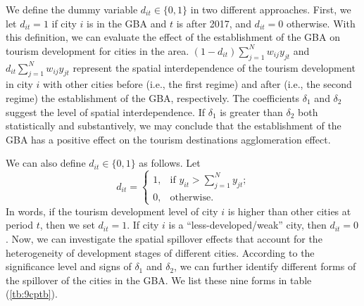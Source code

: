 \documentclass[11pt,a4paper]{amsart}
\theoremstyle{plain}
\theoremstyle{definition}
\begin{document}
\noindent We define the dummy variable $d_{it} \in \{0, 1\}$ in two different approaches. First, we let $d_{it} = 1$ if city $i$ is in the GBA and $t$ is after 2017, and $d_{it} = 0$ otherwise. With this definition, we can evaluate the effect of the establishment of the GBA on tourism development for cities in the area. $(1-d_{it})\sum_{j = 1}^{N}w_{ij}y_{jt}$ and $d_{it}\sum_{j = 1}^{N}w_{ij}y_{jt}$  represent the spatial interdependence of the tourism development in city $i$ with other cities before (i.e., the first regime) and after (i.e., the second regime) the establishment of the GBA, respectively. The coefficients $\delta_{1}$ and $\delta_{2}$ suggest the level of spatial interdependence. If $\delta_{1}$ is greater than $\delta_{2}$ both statistically and substantively, we may conclude that the establishment of the GBA has a positive effect on the tourism destinations agglomeration effect.

\noindent  We can also define $d_{it} \in \{0, 1\}$ as follows. Let 
\[	d_{it} = \begin{cases}
	1, &\text{if $y_{it} > \sum_{j = 1}^{N}y_{jt}$;}\\
	0, &\text{otherwise.}
\end{cases}	\]
In words, if the tourism development level of city $i$ is higher than other cities at period $t$, then we set $d_{it} = 1$. If city $i$ is a ``less-developed/weak'' city, then $d_{it} = 0$. Now, we can investigate the spatial spillover effects that account for the heterogeneity of development stages of different cities. According to the significance level and signs of $\delta_{1}$ and $\delta_{2}$, we can further identify different forms of the spillover of the cities in the GBA. We list these nine forms in table (\ref{tb:9cptb}). 
\end{document}
